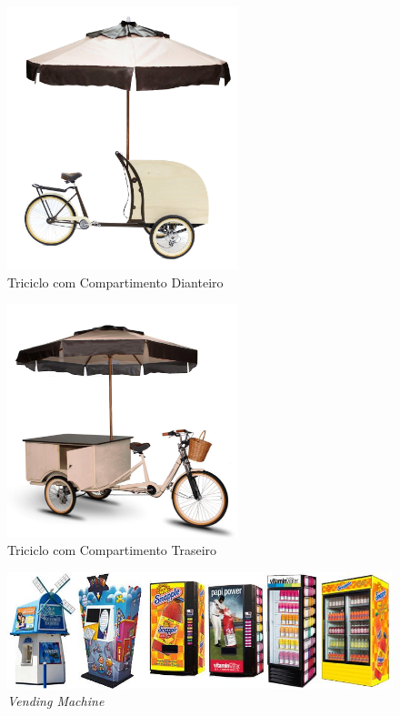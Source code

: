 \begin{figure}[H]
	\centering
    \includegraphics[width=0.6\textwidth]{figuras/exemplo2}
    \caption{Triciclo com Compartimento Dianteiro}
    \label{fig:exemplo2}
\end{figure}

\begin{figure}[H]
	\centering
    \includegraphics[width=0.6\textwidth]{figuras/exemplo}
    \caption{Triciclo com Compartimento Traseiro}
    \label{fig:exemplo}
\end{figure}

\begin{figure}[H]
	\centering
    \includegraphics[width=\textwidth]{figuras/machinewrapsheader}
    \caption{\textit{Vending Machine}}
    \label{fig:machinewrapsheader}
\end{figure}

